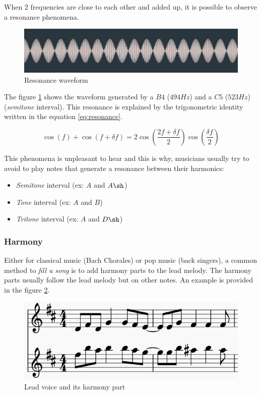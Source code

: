 \documentclass[12pt]{report}
\begin{document}
When 2 frequencies are close to each other and added up, it is possible to observe a resonance phenomena.

\begin{figure}[H]
    \centering
    \includegraphics[width=\textwidth]{images/music/waveform/resonance.jpg}
    \caption{Resonance waveform}
    \label{fig:resonance}
\end{figure}
The figure \ref{fig:resonance} shows the waveform generated by a $B4$ ($494Hz$) and a $C5$ ($523Hz$) (\textit{semitone} interval).
This resonance is explained by the trigonometric identity written in the equation \ref{eq:resonance}.

\begin{equation}
    \cos(f) + \cos(f + \delta f) = 2 \cos(\frac{2f + \delta f}{2}) \cos(\frac{\delta f}{2})
    \label{eq:resonance}
\end{equation}

This phenomena is unpleasant to hear and this is why, musicians usually try to avoid to play notes that generate a resonance between their harmonics:
\begin{itemize}
    \item \textit{Semitone} interval (ex: $A$ and $A\sh$)
    \item \textit{Tone} interval (ex: $A$ and $B$)
    \item \textit{Tritone} interval (ex: $A$ and $D\sh$)
\end{itemize}


\subsubsection{Harmony}

Either for classical music (Bach Chorales) or pop music (back singers), a common method to \textit{fill a song} is to add harmony parts to the lead melody. The harmony parts usually follow the lead melody but on other notes.
An example is provided in the figure \ref{fig:harmony_example}.

\begin{figure}[H]
    \centering
    \includegraphics[width=0.75 \textwidth]{images/music/stave/harmony.jpg}
    \caption{Lead voice and its harmony part}
    \label{fig:harmony_example}
\end{figure}
\end{document}
